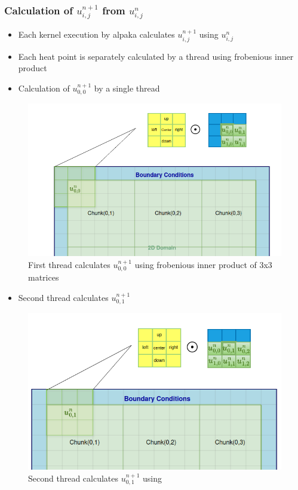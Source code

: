 \documentclass[9pt]{beamer}
\begin{document}
\begin{frame}
\frametitle{Calculation of $u_{i,j}^{n+1}$ from $u_{i,j}^{n}$}
\vspace{-0.9\baselineskip}
    \begin{itemize}
        \item Each kernel execution by alpaka calculates $u_{i,j}^{n+1}$ using $u_{i,j}^{n}$
        \item Each heat point is separately calculated by a thread using frobenious inner product
        \item Calculation of $u_{0,0}^{n+1}$ by a single thread
    \end{itemize}
    \begin{figure}
        \centering
        \includegraphics[width=0.85\linewidth]{Screenshot from 2024-09-02 13-42-49.png}
        \caption{First thread calculates $u_{0,0}^{n+1}$ using frobenious inner product of 3x3 matrices}
        \label{fig:enter-label}
    \end{figure}
\end{frame}

\begin{frame}
\vspace{-0.9\baselineskip}
    \begin{itemize}
        \item Second thread calculates $u_{0,1}^{n+1}$  
    \end{itemize}
    \begin{figure}
        \centering
        \includegraphics[width=0.85\linewidth]{Screenshot from 2024-09-02 13-53-13.png}
        \caption{Second thread calculates $u_{0,1}^{n+1}$ using }
        \label{fig:enter-label}
    \end{figure}
\end{frame}
\end{document}
